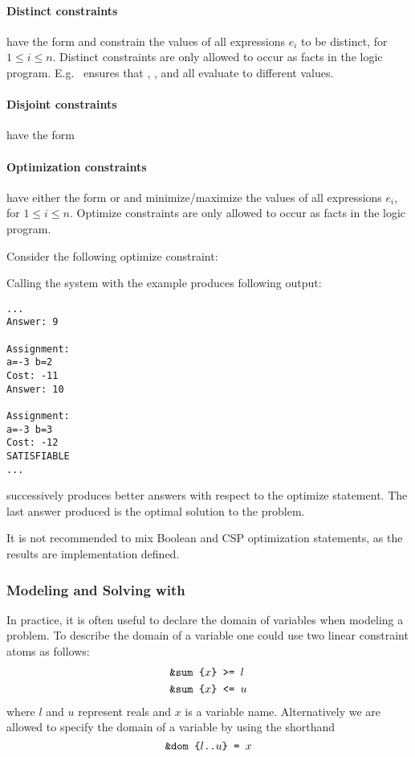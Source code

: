 \paragraph{Distinct constraints} have the form
 and constrain the values of all expressions
$e_i$ to be distinct, for $1\leq i\leq n$.
Distinct constraints are only allowed to occur as facts in the logic program.
E.g.~ ensures that , , and  all evaluate to different values.

\paragraph{Disjoint constraints} have the form

\paragraph{Optimization constraints} have either the form
 or
and minimize/maximize the values of all expressions $e_i$,
for $1\leq i\leq n$.
Optimize constraints are only allowed to occur as facts in the logic program.
\begin{example}\label{ex:lp:csp1}
Consider the following optimize constraint:

Calling the system with the example produces following output:
\begin{lstlisting}[numbers=none]
...
Answer: 9

Assignment:
a=-3 b=2
Cost: -11
Answer: 10

Assignment:
a=-3 b=3
Cost: -12
SATISFIABLE
...
\end{lstlisting}
\clingcon{} successively produces better answers with respect to the optimize statement.
The last answer produced is the optimal solution to the problem.
\end{example}
It is not recommended to mix Boolean and CSP optimization statements, as the results are implementation defined.

\subsubsection{Modeling and Solving with \clingcon}
In practice, it is often useful to declare the domain of variables when modeling a problem.
%
To describe the domain of a variable 
one could use two linear constraint atoms as follows:  
\begin{align*}
&\texttt{\&sum\text{ }\{$x$\}\text{ }>=\text{ }$l$}\\
&\texttt{\&sum\text{ }\{$x$\}\text{ }<=\text{ }$u$}
\end{align*}
where $l$ and $u$ represent reals and $x$ is a variable name. 
%
Alternatively we are allowed to specify the domain of a variable by using the shorthand  
\[
\texttt{\&dom\text{ }\{$l$..$u$\}\text{ }=\text{ }$x$}
\]

